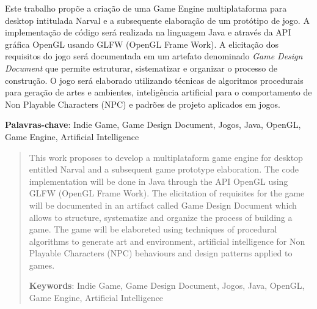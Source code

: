 \documentclass[12pt, 
openright, 
oneside, 
a4paper,    
brazil]{facom-ufu-abntex2}
\begin{document}
\begin{resumo} 

Este trabalho propõe a criação de uma Game Engine multiplataforma para desktop intitulada Narval e a subsequente elaboração de um protótipo de jogo.
A implementação de código será realizada na linguagem Java e através da API gráfica OpenGL usando GLFW (OpenGL Frame Work). 
A elicitação dos requisitos do jogo será documentada em um artefato denominado \textit{Game Design Document} que permite estruturar, sistematizar e organizar 
o processo de construção.
O jogo será elaborado utilizando técnicas de algoritmos procedurais para geração de artes e ambientes, inteligência artificial para o comportamento de Non Playable Characters (NPC) e padrões de projeto aplicados em jogos.
 
 \vspace{\onelineskip}
 \noindent
 \textbf{Palavras-chave}: Indie Game, Game Design Document, Jogos, Java, OpenGL, Game Engine, Artificial Intelligence
\end{resumo}

\begin{abstract} 
This work proposes to develop a multiplataform game engine for desktop entitled Narval and a subsequent game prototype elaboration. 
The code implementation will be done in Java through the API OpenGL using GLFW (OpenGL Frame Work).
The elicitation of requisites for the game will be documented in an artifact called Game Design Document which allows to structure, systematize and organize the process of building a game.
The game will be elaboreted using techniques of procedural algorithms to generate art and environment, artificial intelligence for Non Playable Characters (NPC) behaviours and design patterns applied to games.

 \vspace{\onelineskip}
    
 \noindent
 \textbf{Keywords}: Indie Game, Game Design Document, Jogos, Java, OpenGL, Game Engine, Artificial Intelligence %
\end{abstract}
\cleardoublepage
\end{document}
